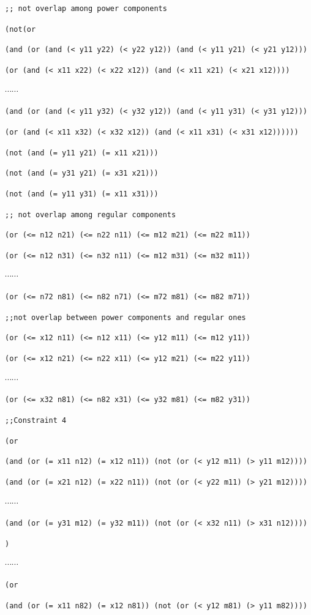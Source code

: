\documentclass[11pt]{article}
\begin{document}
{{\tt ;; not overlap among power components}

{\tt (not(or}

{\tt (and (or (and (< y11 y22) (< y22 y12)) (and (< y11 y21) (< y21 y12)))}

{\tt (or (and (< x11 x22) (< x22 x12)) (and (< x11 x21) (< x21 x12))))}

$\cdots \cdots$

{\tt (and (or (and (< y11 y32) (< y32 y12)) (and (< y11 y31) (< y31 y12)))}

{\tt (or (and (< x11 x32) (< x32 x12)) (and (< x11 x31) (< x31 x12))))))}

{\tt (not (and (= y11 y21) (= x11 x21)))}

{\tt (not (and (= y31 y21) (= x31 x21)))}

{\tt (not (and (= y11 y31) (= x11 x31)))}

{\tt ;; not overlap among regular components}

{\tt (or (<= n12 n21) (<= n22 n11) (<= m12 m21) (<= m22 m11))}

{\tt (or (<= n12 n31) (<= n32 n11) (<= m12 m31) (<= m32 m11))}

$\cdots \cdots$

{\tt (or (<= n72 n81) (<= n82 n71) (<= m72 m81) (<= m82 m71))}

{\tt ;;not overlap between power components and regular ones}

{\tt (or (<= x12 n11) (<= n12 x11) (<= y12 m11) (<= m12 y11))}

{\tt (or (<= x12 n21) (<= n22 x11) (<= y12 m21) (<= m22 y11))}

$\cdots \cdots$

{\tt (or (<= x32 n81) (<= n82 x31) (<= y32 m81) (<= m82 y31))}

{\tt ;;Constraint 4}

{\tt (or}

{\tt (and (or (= x11 n12) (= x12 n11)) (not (or (< y12 m11) (> y11 m12))))}

{\tt (and (or (= x21 n12) (= x22 n11)) (not (or (< y22 m11) (> y21 m12))))}

$\cdots \cdots$

{\tt (and (or (= y31 m12) (= y32 m11)) (not (or (< x32 n11) (> x31 n12))))}

{\tt )}

$\cdots \cdots$

{\tt (or}

{\tt (and (or (= x11 n82) (= x12 n81)) (not (or (< y12 m81) (> y11 m82))))}

}
\end{document}
